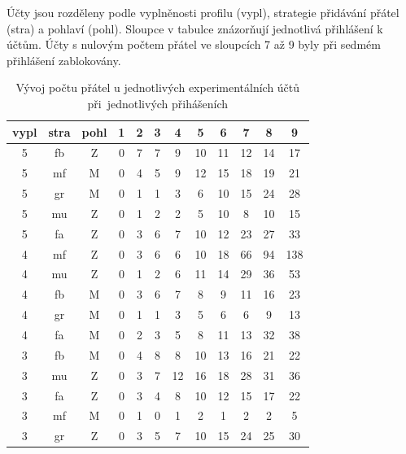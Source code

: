 \documentclass[thesis=M,czech]{FITthesis}[2013/05/10]
\begin{document}
\begin{table}[h]
	\centering
	\caption{Vývoj počtu přátel u jednotlivých experimentálních účtů při~jednotlivých přihášeních}\label{tab:friendsCount}
	Účty jsou rozděleny podle vyplněnosti profilu (vypl), strategie přidávání přátel (stra) a pohlaví (pohl). Sloupce v tabulce znázorňují jednotlivá přihlášení k účtům. Účty s nulovým počtem přátel ve sloupcích 7 až 9 byly při sedmém přihlášení zablokovány.
	
    \begin{tabular}{ccc | ccccccccc}
    \textbf{vypl} & \textbf{stra} & \textbf{pohl} & \textbf{1} & \textbf{2} & \textbf{3} & \textbf{4}  & \textbf{5} & \textbf{6}  & \textbf{7}  & \textbf{8}  & \textbf{9}   \\ \hline
    5          & fb        & Z       & 0 & 7 & 7 & 9  & 10 & 11 & 12 & 14 & 17  \\
    5          & mf        & M       & 0 & 4 & 5 & 9  & 12 & 15 & 18 & 19 & 21  \\
    5          & gr        & M       & 0 & 1 & 1 & 3  & 6  & 10 & 15 & 24 & 28  \\
    5          & mu        & Z       & 0 & 1 & 2 & 2  & 5  & 10 & 8  & 10 & 15  \\
    5          & fa        & Z       & 0 & 3 & 6 & 7  & 10 & 12 & 23 & 27 & 33  \\
    4          & mf        & Z       & 0 & 3 & 6 & 6  & 10 & 18 & 66 & 94 & 138 \\
    4          & mu        & Z       & 0 & 1 & 2 & 6  & 11 & 14 & 29 & 36 & 53  \\
    4          & fb        & M       & 0 & 3 & 6 & 7  & 8  & 9  & 11 & 16 & 23  \\
    4          & gr        & M       & 0 & 1 & 1 & 3  & 5  & 6  & 6  & 9  & 13  \\
    4          & fa        & M       & 0 & 2 & 3 & 5  & 8  & 11 & 13 & 32 & 38  \\
    3          & fb        & M       & 0 & 4 & 8 & 8  & 10 & 13 & 16 & 21 & 22  \\
    3          & mu        & Z       & 0 & 3 & 7 & 12 & 16 & 18 & 28 & 31 & 36  \\
    3          & fa        & Z       & 0 & 3 & 4 & 8  & 10 & 12 & 15 & 17 & 22  \\
    3          & mf        & M       & 0 & 1 & 0 & 1  & 2  & 1  & 2  & 2  & 5   \\
    3          & gr        & Z       & 0 & 3 & 5 & 7  & 10 & 15 & 24 & 25 & 30  \\

\end{tabular}
\end{table}
\end{document}
